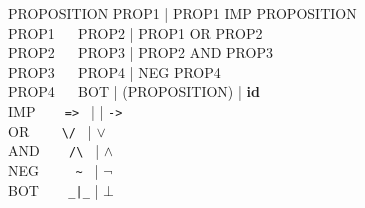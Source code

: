 \documentclass[manual.tex]{subfiles}
\begin{document}
{\ttfamily
\noindent
PROPOSITION   \tra PROP1 | PROP1 IMP PROPOSITION \\
PROP1 $~~~~~~$\tra PROP2 | PROP1 OR PROP2\\
PROP2 $~~~~~~$\tra PROP3 | PROP2 AND PROP3\\
PROP3 $~~~~~~$\tra PROP4 | NEG PROP4\\
PROP4 $~~~~~~$\tra BOT | (PROPOSITION) | {\bf id}\\
IMP $~~~~~~~~$\tra \verb+=> + | \tra | \verb+->+\\
OR $~~~~~~~~~$\tra \verb+\/ + | \(\lor\) \\
AND $~~~~~~~~$\tra \verb+/\ + | \(\land\) \\
NEG $~~~~~~~~$\tra \verb+ ~ + | \(\neg\) \\
BOT $~~~~~~~~$\tra \verb+_|_+ | \(\bot\)
}
\end{document}
